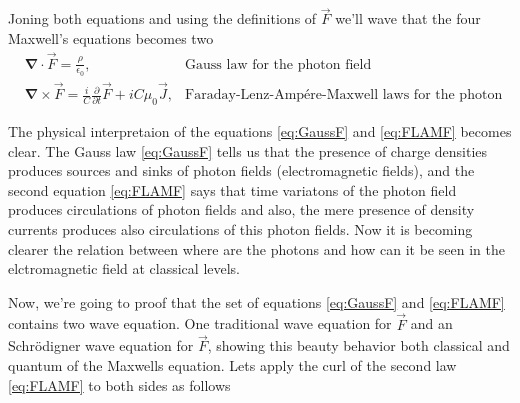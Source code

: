     Joning both equations and using the definitions of $\vec{F}$ we'll wave that the four Maxwell's equations becomes two
    \begin{align}
        & \bm{\nabla} \cdot \vec{F} = \frac{\rho}{\epsilon_0}, & \text{Gauss law for the photon field} \label{eq:GaussF}\\
        & \bm{\nabla}\times \vec{F} = \frac{i}{C}\frac{\partial}{\partial t}\vec{F} + iC\mu_0 \vec{J}, & \text{Faraday-Lenz-Ampére-Maxwell laws for the photon field.} \label{eq:FLAMF}
    \end{align}

    The physical interpretaion of the equations \ref{eq:GaussF} and \ref{eq:FLAMF} becomes clear. The Gauss law \ref{eq:GaussF} tells us that the presence of charge densities produces sources and sinks of photon fields (electromagnetic fields), and the second equation \ref{eq:FLAMF} says that time variatons of the photon field produces circulations of photon fields and also, the mere presence of density currents produces also circulations of this photon fields. Now it is becoming clearer the relation between where are the photons and how can it be seen in the elctromagnetic field at classical levels.

    Now, we're going to proof that the set of equations \ref{eq:GaussF} and \ref{eq:FLAMF} contains two wave equation. One traditional wave equation for $\vec{F}$ and an Schrödigner wave equation for $\vec{F}$, showing this beauty behavior both classical and quantum of the Maxwells equation. Lets apply the curl of the second law \ref{eq:FLAMF} to both sides as follows

